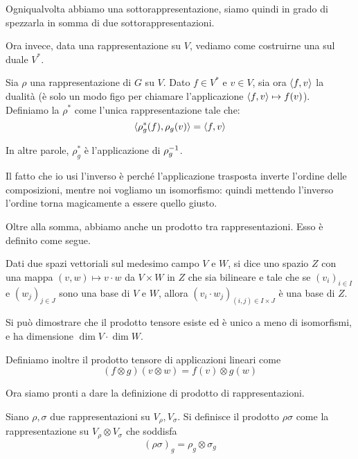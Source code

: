 \documentclass[a4paper,10pt,oneside]{math_article}
\begin{document}
    Ogniqualvolta abbiamo una sottorappresentazione, siamo quindi in grado di spezzarla in somma di due sottorappresentazioni.
    
    Ora invece, data una rappresentazione su $V$, vediamo come costruirne una sul duale $V^*$.
    \begin{mydef}
     Sia $\rho$ una rappresentazione di $G$ su $V$. Dato $f\in V^*$ e $v\in V$, sia ora $\langle f , v\rangle$ la dualità (è solo un modo figo per chiamare l'applicazione $\langle f , v\rangle \mapsto f(v)$). Definiamo la  $\rho^*$ come l'unica rappresentazione tale che:
     \[
      \langle\rho^*_g(f) , \rho_g (v)\rangle=\langle f , v\rangle
     \]
    \end{mydef}
    
    In altre parole, $\rho^*_g$ è l'applicazione  di $\rho_g^{-1}$.

    Il fatto che io usi l'inverso è perché l'applicazione trasposta inverte l'ordine delle composizioni, mentre noi vogliamo un isomorfismo: quindi mettendo l'inverso l'ordine torna magicamente a essere quello giusto.
    
    Oltre alla somma, abbiamo anche un prodotto tra rappresentazioni. Esso è definito come segue. 
    
    \begin{mydef}
     Dati due spazi vettoriali sul medesimo campo $V$ e $W$, si dice  uno spazio $Z$ con una mappa $(v,w) \mapsto v\cdot w$ da $V\times W$ in $Z$ che sia bilineare e tale che se $(v_i)_{i\in I}$ e $(w_j)_{j\in J}$ sono una base di $V$ e $W$, allora $(v_i\cdot w_j)_{(i,j)\in I\times J}$ è una base di $Z$.
    \end{mydef}
    
    Si può dimostrare che il prodotto tensore esiste ed è unico a meno di isomorfismi, e ha dimensione $\dim V \cdot \dim W$.
     
    Definiamo inoltre il prodotto tensore di applicazioni lineari come 
    \[
     (f \otimes g)(v\otimes w)=f(v)\otimes g(w) 
    \]
    
    Ora siamo pronti a dare la definizione di prodotto di rappresentazioni.

    \begin{mydef}
      Siano $\rho,\sigma$ due rappresentazioni su $V_\rho,V_\sigma$. Si definisce il prodotto $\rho\sigma$ come la rappresentazione su $V_\rho \otimes V_\sigma$ che soddisfa
      \[
       (\rho\sigma)_g = \rho_g \otimes \sigma_g
      \]

     
    \end{mydef}
\end{document}
